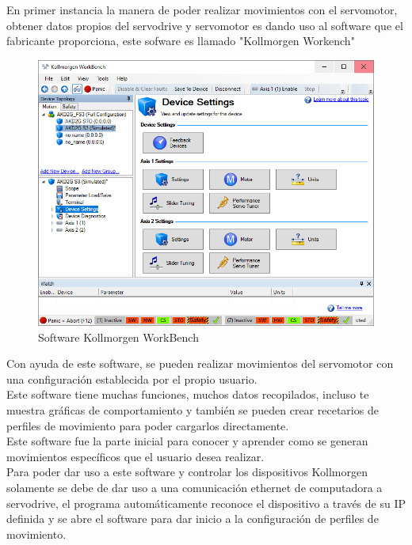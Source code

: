 \documentclass[12pt,titlepage]{article}
\begin{document}
En primer instancia la manera de poder realizar movimientos con el servomotor, obtener datos propios del servodrive y servomotor es dando uso al software que el fabricante proporciona, este sofware es llamado "Kollmorgen Workench" \\ 

\begin{figure}[htbp]
\hspace*{2.5cm} 
\includegraphics[scale=0.55]{WorkBench_0}
\caption{Software  Kollmorgen WorkBench}
\end{figure}

Con ayuda de este software, se pueden realizar movimientos del servomotor con una configuración establecida por el propio usuario.\\

Este software tiene muchas funciones, muchos datos recopilados, incluso te muestra gráficas de comportamiento y también se pueden crear recetarios de perfiles de movimiento para poder cargarlos directamente. \\ 

Este software fue la parte inicial para conocer y aprender como se generan movimientos específicos que el usuario desea realizar. \\ 

Para poder dar uso a este software y controlar los dispositivos Kollmorgen solamente se debe de dar uso a una comunicación ethernet de computadora a servodrive, el programa automáticamente reconoce el dispositivo a través de su IP definida y se abre el software para dar inicio a la configuración de perfiles de movimiento. \\ 
\end{document}
